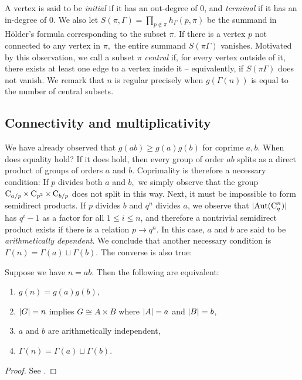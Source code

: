 A vertex is said to be \emph{initial} if it has an out-degree of $0$, and \emph{terminal} if it has an in-degree of $0$. We also let $S(\pi, \Gamma) = \prod_{p \notin \pi}h_\Gamma(p, \pi)$ be the summand in Hölder's formula corresponding to the subset $\pi$. If there is a vertex $p$ not connected to any vertex in $\pi,$ the entire summand $S(\pi \Gamma)$ vanishes. Motivated by this observation, we call a subset $\pi$ \emph{central} if, for every vertex outside of it, there exists at least one edge to a vertex inside it -- equivalently, if $S(\pi \Gamma)$ does not vanish. We remark that $n$ is regular precisely when $g(\Gamma(n))$ is equal to the number of central subsets.

\subsection{Connectivity and multiplicativity}
We have already observed that $g(ab) \ge g(a)g(b)$ for coprime $a, b$. When does equality hold? If it does hold, then every group of order $ab$ splits as a direct product of groups of orders $a$ and $b.$ Coprimality is therefore a necessary condition: If $p$ divides both $a$ and $b,$ we simply observe that the group $\operatorname{C}_{a/p} \times \operatorname{C}_{p^2} \times \operatorname{C}_{b/p}$ does not split in this way. Next, it must be impossible to form semidirect products. If $p$ divides $b$ and $q^n$ divides $a$, we observe that $\lvert\operatorname{Aut}(\operatorname{C}_{q}^n)\rvert$ has $q^i - 1$ as a factor for all $1 \le i \le n$, and therefore a nontrivial semidirect product exists if there is a relation $p \rightarrow q^n.$ In this case, $a$ and $b$ are said to be \emph{arithmetically dependent}. We conclude that another necessary condition is $\Gamma(n) = \Gamma(a) \sqcup \Gamma(b)$.  The converse is also true:

\begin{thm}
	Suppose we have $n = ab$. Then the following are equivalent:
	\begin{enumerate}
		\item $g(n) = g(a)g(b)$,
		\item $\lvert G\rvert = n$ implies $G \cong A \times B$ where $\lvert A\rvert = a$ and $\lvert B\rvert = b$,
		\item $a$ and $b$ are arithmetically independent,
		\item $\Gamma(n) = \Gamma(a) \sqcup \Gamma(b)$.
	\end{enumerate}
\end{thm}
\begin{proof}
	See {\cite[Lem.~21.19]{monolith}}.
\end{proof}

